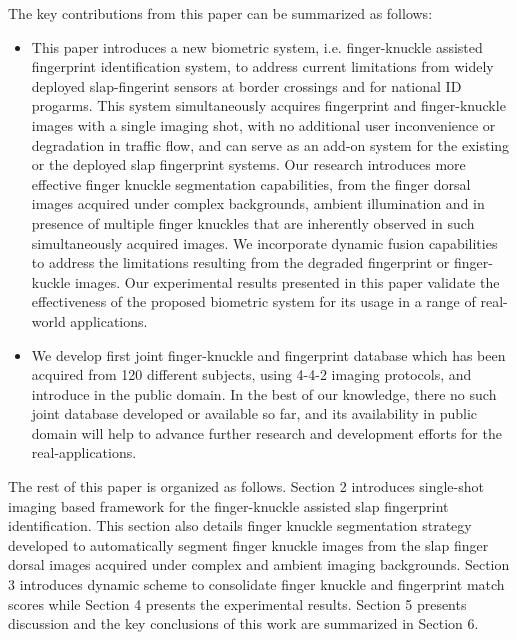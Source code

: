 The key contributions from this paper can be summarized as follows: 

\begin{itemize}
    \item This paper introduces a new biometric system, i.e. finger-knuckle assisted fingerprint identification system, to address current limitations from widely deployed slap-fingerint sensors at border crossings and for national ID progarms. This system simultaneously acquires fingerprint and finger-knuckle images with a single imaging shot, with no additional user inconvenience or degradation in traffic flow, and can serve as an add-on system for the existing or the deployed slap fingerprint systems. Our research introduces more effective finger knuckle segmentation capabilities, from the finger dorsal images acquired under complex backgrounds, ambient illumination and in presence of multiple finger knuckles that are inherently observed in such simultaneously acquired images. We incorporate dynamic fusion capabilities to address the limitations resulting from the degraded fingerprint or finger-kuckle images. Our experimental results presented in this paper validate the effectiveness of the proposed biometric system for its usage in a range of real-world applications. 
    \item We develop first joint finger-knuckle and fingerprint database which has been acquired from 120 different subjects, using 4-4-2 imaging protocols, and introduce in the public domain. In the best of our knowledge, there no such joint database developed or available so far, and its availability in public domain will help to advance further research and development efforts for the real-applications. 
\end{itemize}


The rest of this paper is organized as follows. Section 2 introduces single-shot imaging based framework for the finger-knuckle assisted slap fingerprint identification. This section also details finger knuckle segmentation strategy developed to automatically segment finger knuckle images from the slap finger dorsal images acquired under complex and ambient imaging backgrounds. Section 3 introduces dynamic scheme to consolidate finger knuckle and fingerprint match scores while Section 4 presents the experimental results. Section 5 presents discussion and the key conclusions of this work are summarized in Section 6.